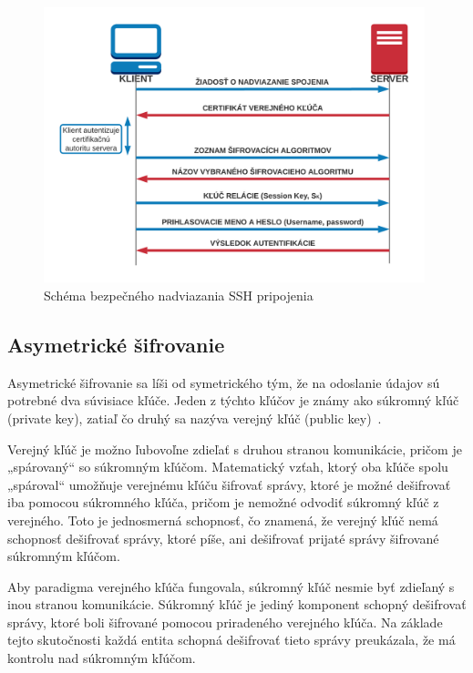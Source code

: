 \begin{figure}[H]
\begin{center}\includegraphics[width=\textwidth,height=8cm,keepaspectratio=true]{assets/symmetric_ssh.png}\end{center}
\caption[Schéma bezpečného nadviazania SSH pripojenia]{Schéma bezpečného nadviazania SSH pripojenia}\label{fig:obr_7}
\end{figure}

\subsection{Asymetrické šifrovanie}\label{subsec:asymetricke-sifrovanie}

Asymetrické šifrovanie sa líši od symetrického tým, že na odoslanie údajov sú potrebné dva súvisiace kľúče.
Jeden z týchto kľúčov je známy ako súkromný kľúč (private key), zatiaľ čo druhý sa nazýva verejný kľúč (public key)~\cite{SshEncryption}.

Verejný kľúč je možno ľubovoľne zdieľať s druhou stranou komunikácie, pričom je „spárovaný“ so súkromným kľúčom.
Matematický vzťah, ktorý oba kľúče spolu „spároval“ umožňuje verejnému kľúču šifrovať správy, ktoré je možné dešifrovať
iba pomocou súkromného kľúča, pričom je nemožné odvodiť súkromný kľúč z verejného.
Toto je jednosmerná schopnosť, čo znamená, že verejný kľúč nemá schopnosť dešifrovať správy, ktoré píše, ani dešifrovať
prijaté správy šifrované súkromným kľúčom.

Aby paradigma verejného kľúča fungovala, súkromný kľúč nesmie byť zdieľaný s inou stranou komunikácie.
Súkromný kľúč je jediný komponent schopný dešifrovať správy, ktoré boli šifrované pomocou priradeného verejného kľúča.
Na základe tejto skutočnosti každá entita schopná dešifrovať tieto správy preukázala, že má kontrolu nad súkromným kľúčom.

